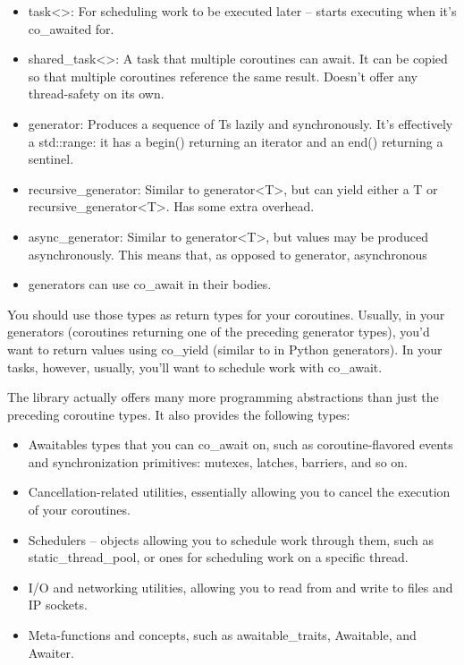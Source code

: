 \begin{itemize}
\item 
task<>: For scheduling work to be executed later – starts executing when it's co\_awaited for.

\item 
shared\_task<>: A task that multiple coroutines can await. It can be copied so that multiple coroutines reference the same result. Doesn't offer any thread-safety on its own.

\item 
generator: Produces a sequence of Ts lazily and synchronously. It's effectively a std::range: it has a begin() returning an iterator and an end() returning a sentinel.

\item 
recursive\_generator: Similar to generator<T>, but can yield either a T or recursive\_generator<T>. Has some extra overhead.

\item 
async\_generator: Similar to generator<T>, but values may be produced asynchronously. This means that, as opposed to generator, asynchronous

\item 
generators can use co\_await in their bodies.
\end{itemize}

You should use those types as return types for your coroutines. Usually, in your generators (coroutines returning one of the preceding generator types), you'd want to return values using co\_yield (similar to in Python generators). In your tasks, however, usually, you'll want to schedule work with co\_await.

The library actually offers many more programming abstractions than just the preceding coroutine types. It also provides the following types:

\begin{itemize}
\item 
Awaitables types that you can co\_await on, such as coroutine-flavored events and synchronization primitives: mutexes, latches, barriers, and so on.

\item 
Cancellation-related utilities, essentially allowing you to cancel the execution of your coroutines.

\item 
Schedulers – objects allowing you to schedule work through them, such as static\_thread\_pool, or ones for scheduling work on a specific thread.

\item 
I/O and networking utilities, allowing you to read from and write to files and IP sockets.

\item 
Meta-functions and concepts, such as awaitable\_traits, Awaitable, and Awaiter.
\end{itemize}

